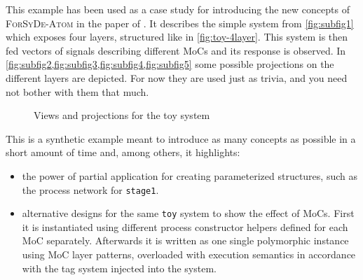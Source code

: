 This example has been used as a case study for introducing the new concepts of \textsc{ForSyDe-Atom} in the paper of \cite{ungureanu17}. It describes the simple system from \cref{fig:subfig1} which exposes four layers, structured like in \cref{fig:toy-4layer}. This system is then fed vectors of signals describing different MoCs and its response is observed. In \cref{fig:subfig2,fig:subfig3,fig:subfig4,fig:subfig5} some possible projections on the different layers are depicted. For now they are used just as trivia, and you need not bother with them that much.
\vspace{-.4cm}
\begin{figure}[ht!]
  \centering
  \hfill
  \hfill
  \hfill
  \hfill
  \hfill
\caption{Views and projections for the toy system}\label{fig:application}
\end{figure}

This is a synthetic example meant to introduce as many concepts as possible in a short amount of time and, among others, it highlights:
\begin{itemize}
\item the power of partial application for creating parameterized structures, such as the process network for \texttt{stage1}.
\item alternative designs for the same \texttt{toy} system to show the effect of MoCs. First it is instantiated using different process constructor helpers defined for each MoC separately. Afterwards it is written as one single polymorphic instance using MoC layer patterns, overloaded with execution semantics in accordance with the tag system injected into the system.
\end{itemize}

